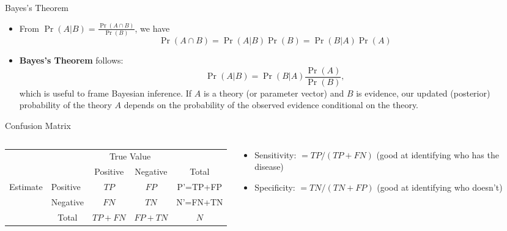 \begin{frame}{Bayes's Theorem}
\begin{itemize}
	\item From $\Pr\left(A|B\right) = \frac{\Pr\left(A \cap B\right)}{\Pr(B)}$, we have\[
		\Pr\left(A \cap B\right) = \Pr\left(A|B\right) \Pr(B) =  \Pr\left(B|A\right) \Pr(A)
	\]
	
	\medskip
	\item {\bf Bayes's Theorem} follows:\[
		\Pr\left(A|B\right) =  \Pr\left(B|A\right) \frac{ \Pr(A)}{\Pr(B) },
	\]
	which is useful to frame Bayesian inference. If $A$ is a theory (or parameter vector) and $B$ is evidence,
	our updated (posterior) probability of the theory $A$ depends on the probability of the observed evidence conditional on the theory. 
	
	
\end{itemize}
\end{frame}

\begin{frame}{Confusion Matrix}
\begin{columns}
\begin{column}{0.6\textwidth}
\begin{tabular}{l|l|c|c|c}
\multicolumn{2}{c}{}&\multicolumn{2}{c}{True Value}&\\ 
\cmidrule{3-4}
\multicolumn{2}{c|}{}&Positive&Negative&\multicolumn{1}{c}{Total}\\
\cmidrule{2-4}
\multirow{2}{*}{Estimate}& Positive & $TP$ & $ FP$ & P'=TP+FP\\
\cmidrule{2-4}
& Negative & $ FN $ & $ TN $ & N'=FN+TN\\
\cmidrule{2-4}
\multicolumn{1}{c}{} & \multicolumn{1}{c}{Total} & \multicolumn{1}{c}{$TP+FN$} & \multicolumn{    1}{c}{$FP+TN$} & \multicolumn{1}{c}{$N$}\\
\end{tabular}
\end{column}
\begin{column}{0.4\textwidth}
\begin{itemize}
	\item Sensitivity: $=TP/(TP + FN)$ (good at identifying who has the disease)
	\item Specificity: $=TN/(TN + FP)$ (good at identifying who doesn't)
\end{itemize}
\end{column}
\end{columns}
\end{frame}


